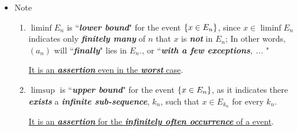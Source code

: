 \documentclass[11pt]{article}
\begin{document}
\begin{itemize}
\begin{proof}
To show $\liminf\limits_{n\rightarrow \infty}E_{n} \subseteq  \set{x\;\Big|\; \sum_{n=1}^{\infty}\mathds{1}_{E_{n}^{c}}(x)  < \infty}$, we see that $x\in \liminf\limits_{n\rightarrow \infty}E_{n}$, iff for some $k\ge 1$,  $x\in E_{n} \Rightarrow \mathds{1}_{E_{n}}(x) = 1;$ or $\mathds{1}_{E_{n}^{c}}(x)=0$ holds for all $n\ge k$ $\Rightarrow$ $\sum_{n\ge k}\mathds{1}_{E_{n}^{c}}(x) = 0$. 

Choose one such $k$, the following decomposition holds
\begin{align*}
\sum_{n=1}^{\infty}\mathds{1}_{E_{n}^{c}}(x) &= \sum_{n=1}^{k}\mathds{1}_{E_{n}^{c}}(x) + \sum_{n\ge k}\mathds{1}_{E_{n}^{c}}(x) \\
&\le k < \infty,
\end{align*}which prove the inclusion part.

To show the converse, see that $x\in \set{x\;\Big|\; \sum_{n=1}^{\infty}\mathds{1}_{E_{n}^{c}}(x)  < \infty}$, means that it is possible to find $k\ge  1$ such that $\sum_{n\ge k}\mathds{1}_{E_{n}^{c}}(x) = 0$, which means that $x\in E_{n}, \forall n\ge k$, therefore $x\in \liminf\limits_{n\rightarrow \infty}E_{n} \Rightarrow \liminf\limits_{n\rightarrow \infty}E_{n} \supset  \set{x\;\Big|\; \sum_{n=1}^{\infty}\mathds{1}_{E_{n}^{c}}(x)  < \infty}.$  \qed
\end{proof}

\item  \begin{remark} Note 
\begin{enumerate}
\item  $\liminf E_{n}$ is ``\emph{\textbf{lower bound}}" for the event $\left\{x\in E_{n}\right\}$, since  $x\in \liminf E_{n}$ indicates only \emph{\textbf{finitely many}} of $n$ that $x$ is \emph{\textbf{not}} in $E_{n}$; In other words, $(a_{n})$ will ``\emph{\textbf{finally}}" lies in $E_{n}$., or ``\emph{\textbf{with a few exceptions}, ...} "

\underline{It is an \emph{\textbf{assertion}} even in the \emph{\textbf{worst}} case}.

\item $\limsup$ is ``\emph{\textbf{upper bound}}" for the event $\left\{x\in E_{n}\right\}$, as it indicates there \emph{\textbf{exists}} a \emph{\textbf{infinite sub-sequence}}, $k_{n}$, such that $x\in E_{k_n}$ for every $k_{n}$. 

\underline{It is an \emph{\textbf{assertion}} for the \emph{\textbf{infinitely often occurrence}}  of a event}.
\end{enumerate}
\end{remark}
\end{itemize}
\end{document}

